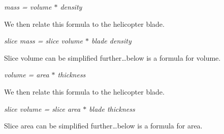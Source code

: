 \documentclass[a4paper, 11pt, oneside]{book} %
\begin{document}
\textit{mass = volume $*$ density}\\

\vspace{0.5\baselineskip} %
\vspace{0.5\baselineskip} %

We then relate this formula to the helicopter blade.\\

\vspace{0.5\baselineskip} %
\vspace{0.5\baselineskip} %

\textit{slice mass = slice volume $*$ blade density}\\

\vspace{0.5\baselineskip} %
\vspace{0.5\baselineskip} %

Slice volume can be simplified further\dots below is a formula for volume.

\vspace{0.5\baselineskip} %
\vspace{0.5\baselineskip} %

\textit{volume = area $*$ thickness}\\

\vspace{0.5\baselineskip} %
\vspace{0.5\baselineskip} %

We then relate this formula to the helicopter blade.\\

\vspace{0.5\baselineskip} %
\vspace{0.5\baselineskip} %

\textit{slice volume = slice area $*$ blade thickness}\\

\vspace{0.5\baselineskip} %
\vspace{0.5\baselineskip} %

Slice area can be simplified further\dots below is a formula for area.
\end{document}

